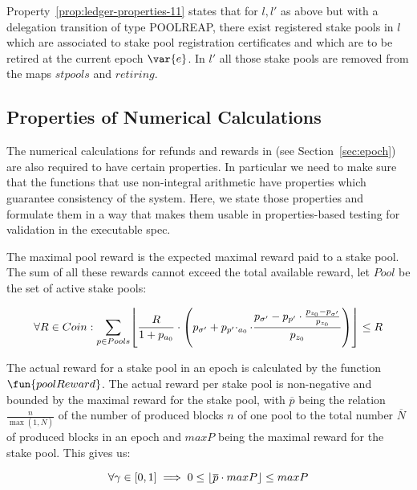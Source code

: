 Property~\ref{prop:ledger-properties-11} states that for $l, l'$ as above but
with a delegation transition of type POOLREAP, there exist registered stake
pools in $l$ which are associated to stake pool registration certificates and
which are to be retired at the current epoch $\var{e}$. In $l'$ all those stake
pools are removed from the maps $stpools$ and $retiring$.

\subsection{Properties of Numerical Calculations}
\label{sec:prop-numer-calc}

The numerical calculations for refunds and rewards in
(see Section~\ref{sec:epoch}) are also required to have certain properties. In
particular we need to make sure that the functions that use non-integral
arithmetic have properties which guarantee consistency of the system. Here, we
state those properties and formulate them in a way that makes them usable in
properties-based testing for validation in the executable spec.

\begin{property}
  \label{prop:maximal-pool-reward}

  The maximal pool reward is the expected maximal reward paid to a stake
  pool. The sum of all these rewards cannot exceed the total available reward,
  let $Pool$ be the set of active stake pools:

  \begin{equation*}
    \forall R \in Coin:\sum_{p \in Pools} \floor*{\frac{R}{1+p_{a_{0}}}\cdot
      \left(
        p_{\sigma'}+p_{p'}\cdotp_{a_{0}}\cdot\frac{p_{\sigma'}-p_{p'}\cdot\frac{p_{z_{0}}-p_{\sigma'}}{p_{z_{0}}}}{p_{z_{0}}}
      \right)}\leq R
  \end{equation*}
\end{property}

\begin{property}
  \label{prop:actual-reward}

  The actual reward for a stake pool in an epoch is calculated by the function
  $\fun{poolReward}$. The actual reward per stake pool is non-negative and
  bounded by the maximal reward for the stake pool, with $\overline{p}$ being
  the relation $\frac{n}{\max(1, \overline{N})}$ of the number of produced
  blocks $n$ of one pool to the total number $\overline{N}$ of produced blocks
  in an epoch and $maxP$ being the maximal reward for the stake pool. This gives
  us:

  \begin{equation*}
    \forall \gamma \in [0,1] \implies 0\leq \floor*{\overline{p}\cdot maxP} \leq maxP
  \end{equation*}
\end{property}


